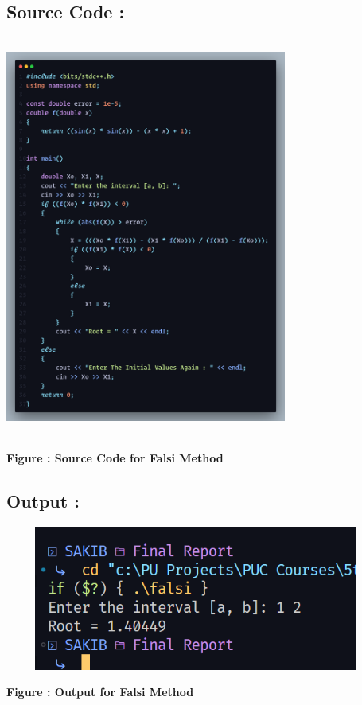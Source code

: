 \documentclass{scrreprt}
\begin{document}
\subsection*{Source Code : }
\begin{center}
    {\includegraphics[width=350px, height=500px]{falsi_code.png}}
    \parbox{0.8\textwidth}{ 
        \centering
        \textbf{Figure : Source Code for Falsi Method}
    }
\newpage
\end{center}
\subsection*{Output : }
\begin{center}
    {\includegraphics[width=475px, height=180px]{falsi_output1.png}}
    \parbox{0.8\textwidth}{ 
        \centering
        \textbf{Figure : Output for Falsi Method}
    }
\end{center}
\end{document}

